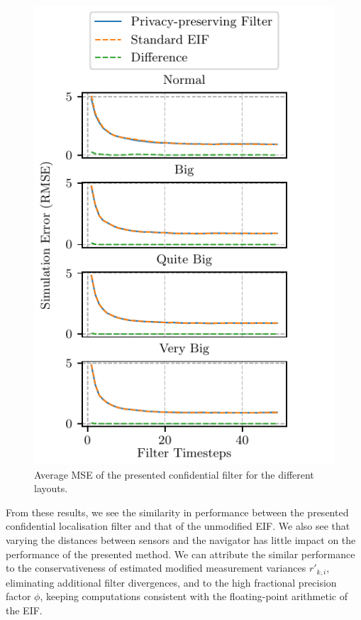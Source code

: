 \begin{figure}[htbp]
    \centering
    \includegraphics{figures/layout_errors.pdf}
    \caption{Average MSE of the presented confidential filter for the different layouts.}
    \label{fig:nonlin_fusion:simulation_layout_errors}
\end{figure}
From these results, we see the similarity in performance between the presented confidential localisation filter and that of the unmodified EIF. We also see that varying the distances between sensors and the navigator has little impact on the performance of the presented method. We can attribute the similar performance to the conservativeness of estimated modified measurement variances $r'_{k, i}$, eliminating additional filter divergences, and to the high fractional precision factor $\phi$, keeping computations consistent with the floating-point arithmetic of the EIF.

